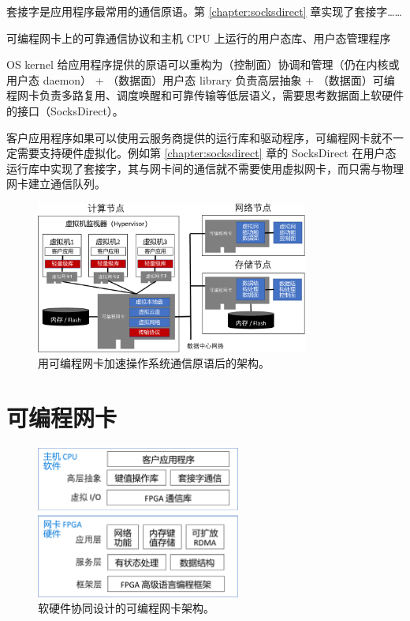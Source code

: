 套接字是应用程序最常用的通信原语。第 \ref{chapter:socksdirect} 章实现了套接字……

可编程网卡上的可靠通信协议和主机 CPU 上运行的用户态库、用户态管理程序

OS kernel 给应用程序提供的原语可以重构为（控制面）协调和管理（仍在内核或用户态 daemon） + （数据面）用户态 library 负责高层抽象 + （数据面）可编程网卡负责多路复用、调度唤醒和可靠传输等低层语义，需要思考数据面上软硬件的接口（SocksDirect）。

客户应用程序如果可以使用云服务商提供的运行库和驱动程序，可编程网卡就不一定需要支持硬件虚拟化。例如第 \ref{chapter:socksdirect} 章的 SocksDirect 在用户态运行库中实现了套接字，其与网卡间的通信就不需要使用虚拟网卡，而只需与物理网卡建立通信队列。

\begin{figure}[htbp]
	\centering
	\includegraphics[width=0.8\textwidth]{figures/os_primitives_accel.pdf}
	\caption{用可编程网卡加速操作系统通信原语后的架构。}
	\label{arch:fig:os-primitives-accel}
\end{figure}


\section{可编程网卡}



\begin{figure}[htbp]
	\centering
	\includegraphics[width=0.6\textwidth]{figures/sw_hw_codesign.pdf}
	\caption{软硬件协同设计的可编程网卡架构。}
	\label{arch:fig:sw-hw-codesign}
\end{figure}


